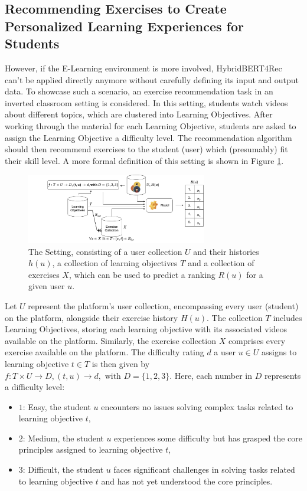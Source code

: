 \documentclass{Academic}
\begin{document}
        \subsection{Recommending Exercises to Create Personalized Learning Experiences for Students}
        However, if the E-Learning environment is more involved, HybridBERT4Rec can't be applied directly anymore without carefully defining its input and output data. To showcase such a scenario, an exercise recommendation task in an inverted classroom setting is considered. In this setting, students watch videos about different topics, which are clustered into Learning Objectives. After working through the material for each Learning Objective, students are asked to assign the Learning Objective a difficulty level. The recommendation algorithm should then recommend exercises to the student (user) which (presumably) fit their skill level. A more formal definition of this setting is shown in Figure \ref{fig:setting}.
        \begin{figure}[ht!]
            \centering
            \includegraphics[width=0.7\textwidth]{images/setting.pdf}
            \caption{The Setting, consisting of a user collection $U$ and their histories $h(u)$, a collection of learning objectives $T$ and a collection of exercises $X$, which can be used to predict a ranking $R(u)$ for a given user $u$.}
            \label{fig:setting}
        \end{figure}
        Let $U$ represent the platform's user collection, encompassing every user (student) on the platform, alongside their exercise history $H(u)$. The collection $T$ includes Learning Objectives, storing each learning objective with its associated videos available on the platform. Similarly, the exercise collection $X$ comprises every exercise available on the platform. The difficulty rating $d$ a user $u \in U$ assigns to learning objective $t \in T$ is then given by $f:T \times U \rightarrow D, (t,u) \rightarrow d, \text{ with } D = \{1,2,3\}$. Here, each number in $D$ represents a difficulty level:
        \begin{itemize}
            \item $1$: Easy, the student $u$ encounters no issues solving complex tasks related to learning objective $t$,
            \item $2$: Medium, the student $u$ experiences some difficulty but has grasped the core principles assigned to learning objective $t$,
            \item $3$: Difficult, the student $u$ faces significant challenges in solving tasks related to learning objective $t$ and has not yet understood the core principles.
        \end{itemize}
\end{document}
